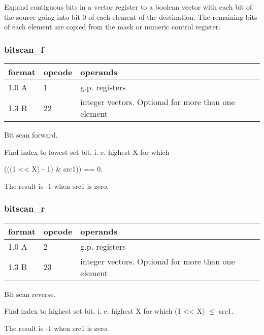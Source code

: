 \documentclass[forwardcom.tex]{subfiles}
\begin{document}
Expand contiguous bits in a vector register to a boolean vector with each bit of the source going into bit 0 of each element of the destination. 
The remaining bits of each element are copied from the mask or numeric control register.

\subsubsection{bitscan\_f}
\label{table:bitscanFInstruction}
\begin{tabular}{|p{12mm}|p{12mm}|p{110mm}|}
\hline
\bfseries format & \bfseries opcode & \bfseries operands \\ \hline
1.0 A &  1 & g.p. registers \\ \hline
1.3 B & 22 & integer vectors. Optional for more than one element \\ \hline
\end{tabular}
\vspace{2mm}

Bit scan forward. 
\vspace{2mm}

Find index to lowest set bit, i. e. highest X for which 

(((1 \textless\textless{} X) - 1) \& src1)) == 0.
\vspace{2mm}

The result is -1 when src1 is zero.

\subsubsection{bitscan\_r}
\label{table:bitscanRInstruction}
\begin{tabular}{|p{12mm}|p{12mm}|p{110mm}|}
\hline
\bfseries format & \bfseries opcode & \bfseries operands \\ \hline
1.0 A &  2 & g.p. registers \\ \hline
1.3 B & 23 & integer vectors. Optional for more than one element \\ \hline
\end{tabular}
\vspace{2mm}

Bit scan reverse. 
\vspace{2mm}

Find index to highest set bit, i. e. highest X for which (1 \textless\textless{} X) $\leq$ src1.
\vspace{2mm}

The result is -1 when src1 is zero.
\end{document}
